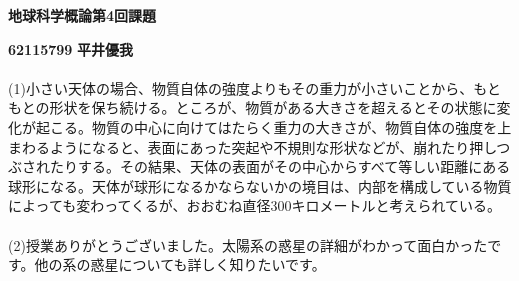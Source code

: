 \documentclass[a4paper,10.5pt]{ltjsarticle}
\begin{document}
\centerline
{\huge \bfseries 地球科学概論第4回課題}
\leftline
{\bfseries 62115799}
{\bfseries 平井優我}\\
\\
(1)小さい天体の場合、物質自体の強度よりもその重力が小さいことから、もともとの形状を保ち続ける。ところが、物質がある大きさを超えるとその状態に変化が起こる。物質の中心に向けてはたらく重力の大きさが、物質自体の強度を上まわるようになると、表面にあった突起や不規則な形状などが、崩れたり押しつぶされたりする。その結果、天体の表面がその中心からすべて等しい距離にある球形になる。天体が球形になるかならないかの境目は、内部を構成している物質によっても変わってくるが、おおむね直径300キロメートルと考えられている。\\
\\
(2)授業ありがとうございました。太陽系の惑星の詳細がわかって面白かったです。他の系の惑星についても詳しく知りたいです。
\end{document}

